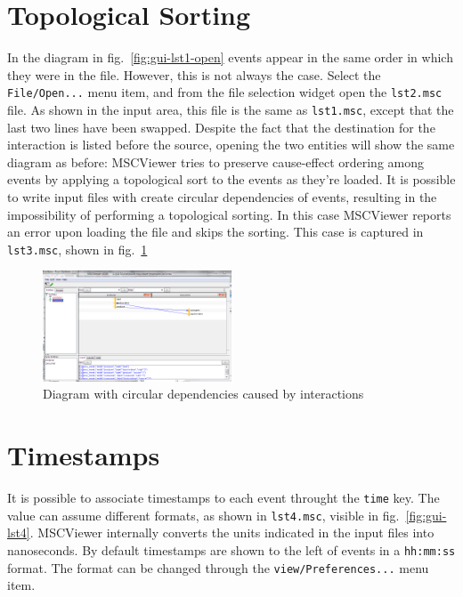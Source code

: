 \documentclass[11pt, twoside, titlepage]{book}
\newcommand{\prog}{MSCViewer}
\begin{document}
\section{Topological Sorting}
In the diagram in fig.~\ref{fig:gui-lst1-open} events appear in the 
same order in which they were in the file. However, this is not always
the case. Select the \texttt{File/Open...} menu item, and from the file
selection widget open the \texttt{lst2.msc} file. As shown in the input area,
this file is the same as \texttt{lst1.msc}, except that the last two lines have
been swapped. Despite the fact that the destination for the interaction is
listed before the source, opening the two entities will show the same diagram as
before: \prog{} tries to preserve cause-effect ordering among events by applying
a topological sort to the events as they're loaded. It is possible to write
input files with create circular dependencies of events, resulting in the
impossibility of performing a topological sorting. In this case \prog{} reports
an error upon loading the file and skips the sorting. This case is captured in
\texttt{lst3.msc}, shown in fig.~\ref{fig:gui-lst3}

\begin{figure}[ht!]
  \centering
  \includegraphics[width=0.5\textwidth,natwidth=1024,natheight=600]{gui-ex3-cycle.png}
  \caption{Diagram with circular dependencies caused by interactions}
  \label{fig:gui-lst3}
\end{figure}

\section{Timestamps}
It is possible to associate timestamps to each event throught the \texttt{time}
key. The value can assume different formats, as shown in \texttt{lst4.msc},
visible in fig.~\ref{fig:gui-lst4}. \prog{} internally converts the units
indicated in the input files into nanoseconds. By default timestamps are shown
to the left of events in a \texttt{hh:mm:ss} format. The format can be changed
through the \texttt{view/Preferences...} menu item.
\end{document}
